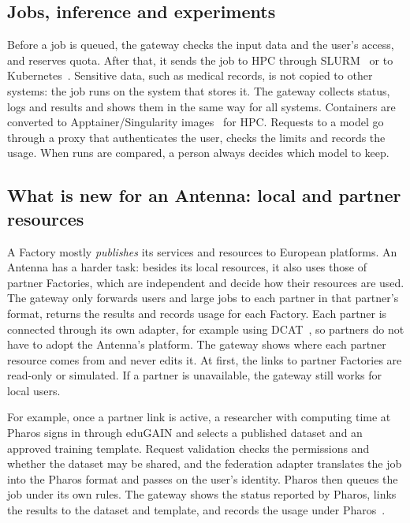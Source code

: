 \documentclass[conference,a4paper]{IEEEtran}
\newif\ifizmene
\DeclareRobustCommand{\roz}[1]{#1}
\DeclareRobustCommand{\nov}[1]{#1}
\DeclareRobustCommand{\tri}[1]{#1}
\DeclareRobustCommand{\fin}[1]{\ifizmene{\color{finalna}#1}\else#1\fi}
\begin{document}
\subsection{Jobs, inference and experiments}
Before a job \roz{is queued}, the gateway checks the input data and the user's access, and reserves quota. \roz{After that,} it sends the job to HPC through SLURM~\cite{yoo2003slurm} or to Kubernetes~\cite{burns2016borg}. \nov{\tri{Sensitive data, such as medical records, is not copied to other systems: the job runs on the system that stores it.}} The gateway collects status, logs and results and shows them in the same way for all systems. \roz{Containers} are converted to Apptainer/Singularity images~\cite{kurtzer2017singularity} for HPC. \nov{Requests to a model go through a proxy that authenticates the user, checks the limits and records the usage.} \roz{When runs are compared,} a person always decides which model to keep.

\subsection{\nov{What is new for an Antenna: local and partner resources}}
A Factory mostly \emph{publishes} its services and resources to European platforms. \nov{\tri{An Antenna has a harder task: besides its local resources, it also uses those of partner Factories, which are independent and decide how their resources are used.} \tri{The gateway only forwards users and large jobs to each partner in that partner's format, returns the results and records usage for each Factory.}} Each partner is connected through its own adapter, for example using DCAT~\cite{w3c_dcat3}\nov{, so partners do not have to adopt the Antenna's platform}. \roz{The gateway shows where each partner resource comes from and never edits it. At first, the links to partner Factories are read-only or simulated. If a partner is unavailable, the gateway still works for local users.}

\fin{For example, once a partner link is active, a researcher with computing time at Pharos signs in through eduGAIN and selects a published dataset and an approved training template. Request validation checks the permissions and whether the dataset may be shared, and the federation adapter translates the job into the Pharos format and passes on the user's identity. Pharos then queues the job under its own rules. The gateway shows the status reported by Pharos, links the results to the dataset and template, and records the usage under Pharos~\cite{saifa_d31}.}
\end{document}
